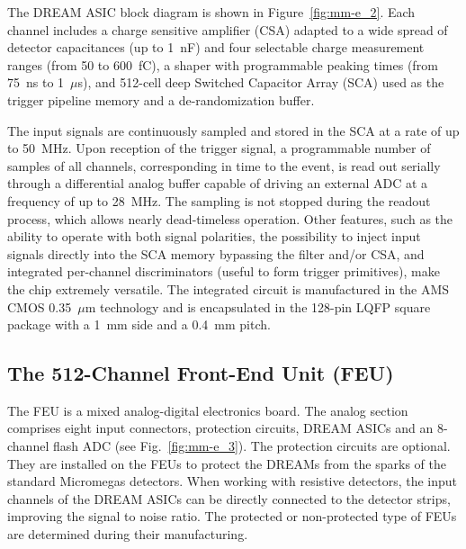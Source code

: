 The DREAM ASIC block diagram is shown in Figure~\ref{fig:mm-e_2}. Each channel includes a charge sensitive amplifier 
(CSA) adapted to a wide spread of detector capacitances (up to 1~nF) and
four selectable charge measurement ranges (from 50 to 600~fC), a shaper with programmable peaking times (from 75~ns to
1~$\mu$s), and 512-cell deep Switched Capacitor Array (SCA) used as the trigger pipeline memory and a de-randomization buffer.

The input signals are continuously sampled and stored in the SCA at a rate of up to 50~MHz. Upon reception of the trigger signal,
a programmable number of samples of all channels, corresponding in time to the event, is read out serially through a differential
analog buffer capable of driving an external ADC at a frequency of up to 28~MHz. The sampling is not stopped during the readout
process, which allows nearly dead-timeless operation. Other features, such as the ability to operate with both signal polarities,
the possibility to inject input signals directly into the SCA memory bypassing the filter and/or CSA, and integrated per-channel
discriminators (useful to form trigger primitives), make the chip extremely versatile. The integrated circuit is manufactured in
the AMS CMOS 0.35~$\mu$m technology and is encapsulated in the 128-pin LQFP square package with a 1~mm side and a
0.4~mm pitch.

\subsection{The 512-Channel Front-End Unit (FEU)}

The FEU is a mixed analog-digital electronics board. The analog section comprises eight input connectors, protection circuits,
DREAM ASICs and an 8-channel flash ADC (see Fig.~\ref{fig:mm-e_3}). The protection circuits are optional.  They are installed
on the FEUs to protect the DREAMs from the sparks of the standard Micromegas detectors. When working with resistive
detectors, the input channels of the DREAM ASICs can be directly connected to the detector strips, improving the signal to
noise ratio. The protected or non-protected type of FEUs are determined during their manufacturing.

